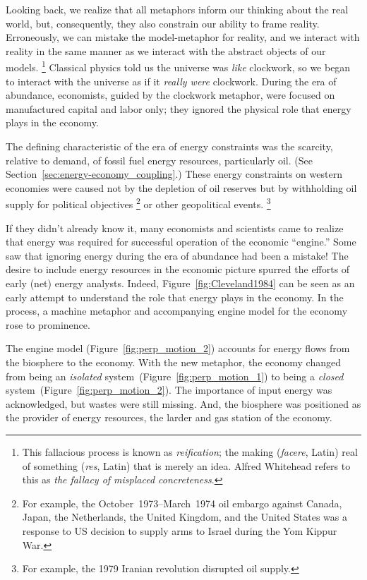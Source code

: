 Looking back, we realize that 
all metaphors inform our thinking about the real world,
but, consequently,
they also constrain our ability to frame reality.
Erroneously, we can mistake the model-metaphor for reality, and
we interact with reality in the same manner 
as we interact with the abstract objects of our
models.%
	\footnote{
	This fallacious process is known as
	\emph{reification}; the making (\emph{facere}, Latin) real of
	something (\emph{res}, Latin) that is merely an idea.
	Alfred Whitehead refers to this as
	\emph{the fallacy of misplaced concreteness}.\cite{Whitehead2011}
	}
Classical physics told us the universe was
\emph{like} clockwork, 
so we began to interact with the universe
as if it \emph{really were} clockwork.
During the era of abundance, 
economists, guided by the clockwork metaphor,
were focused on manufactured capital and labor only;
they ignored the physical role that energy plays in the economy.

The defining characteristic of the era of energy constraints
was the scarcity, relative to demand, of fossil fuel energy resources, particularly oil.
(See Section~\ref{sec:energy-economy_coupling}.)
These energy constraints on western economies were caused
not by the depletion of oil reserves
but by withholding oil supply for political objectives%
	\footnote{
	For example,
	the October~1973--March~1974 oil embargo against 
	Canada, 
	Japan, 
	the Netherlands, 
	the United Kingdom, and 
	the United States 
	was a response to US decision to supply arms to Israel
	during the Yom Kippur War.
	}
or other geopolitical events.%
	\footnote{
	For example, 
	the 1979 Iranian revolution disrupted oil supply.
	}

If they didn't already know it, many economists and scientists
came to realize that energy was required
for successful operation of the economic ``engine.''
Some saw that ignoring energy during the era of abundance
had been a mistake!
The desire to include energy resources
in the economic picture
spurred the efforts of early (net) energy 
analysts.\cite{Gilliland1975, Chapman1976}
Indeed, Figure~\ref{fig:Cleveland1984} can be seen as an early attempt
to understand the role that energy plays in the economy.
In the process, a machine metaphor and 
accompanying engine model for the economy 
rose to prominence.

The engine model (Figure~\ref{fig:perp_motion_2}) 
accounts for energy flows from the biosphere 
to the economy.
With the new metaphor, 
the economy changed 
from being an \emph{isolated} system~(Figure~\ref{fig:perp_motion_1}) 
to being a \emph{closed} system~(Figure~\ref{fig:perp_motion_2}). 
The importance of input energy was acknowledged, 
but wastes were still missing.
And, the biosphere was positioned as the provider of energy resources, 
the larder and gas station of the economy.\cite{Norgaard2010}

